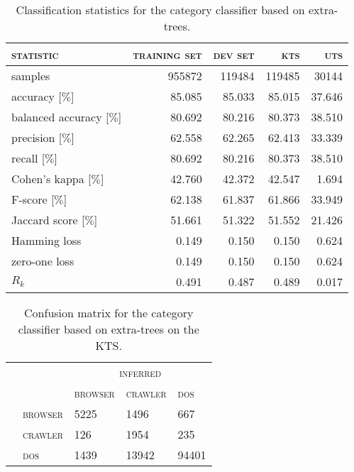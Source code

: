\begin{table}[H]
	\centering
	\begin{tabular}{lrrrr}
		\toprule
		\textsc{statistic} & \textsc{training set} & \textsc{dev set} & \textsc{kts} & \textsc{uts}\\
		\midrule
		samples & 955872 & 119484 & 119485 & 30144\\
		accuracy [$\%$] & 85.085 & 85.033 & 85.015 & 37.646\\
		balanced accuracy [$\%$] & 80.692 & 80.216 & 80.373 & 38.510\\
		precision [$\%$] & 62.558 & 62.265 & 62.413 & 33.339\\
		recall [$\%$] & 80.692 & 80.216 & 80.373 & 38.510\\
		Cohen’s kappa [$\%$] & 42.760 & 42.372 & 42.547 & 1.694\\
		F-score [$\%$] & 62.138 & 61.837 & 61.866 & 33.949\\
		Jaccard score [$\%$] & 51.661 & 51.322 & 51.552 & 21.426\\
		Hamming loss & 0.149 & 0.150 & 0.150 & 0.624\\
		zero-one loss & 0.149 & 0.150 & 0.150 & 0.624\\
		$R_k$ & 0.491 & 0.487 & 0.489 & 0.017\\
		\bottomrule
	\end{tabular}
	\caption{Classification statistics for the category classifier based on extra-trees.}
	\label{tab:classification_category_extra_trees}
\end{table}
\begin{table}[H]
	\centering
	\begin{tabular}{ll|lll}
	\setlength{\tabcolsep}{2pt}
		 & & \multicolumn{3}{c}{\textsc{inferred}}\\
		 & & \textsc{browser} & \textsc{crawler} & \textsc{dos}\\
		\midrule
		\multirow{3}{*}{\rotatebox{90}{\textsc{target}}} & \textsc{browser} & 5225 & 1496 & 667\\
		 & \textsc{crawler} & 126 & 1954 & 235\\
		 & \textsc{dos} & 1439 & 13942 & 94401\\
	\end{tabular}
	\caption{Confusion matrix for the category classifier based on extra-trees on the KTS.}
	\label{tab:confusion_category_extra_trees}
\end{table}
